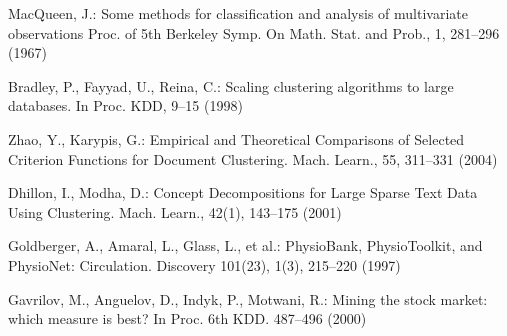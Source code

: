 \documentclass[conference]{IEEEtran}
\begin{document}
\begin{thebibliography}{5}
MacQueen, J.:
Some methods for classification and analysis of multivariate observations
Proc. of 5th Berkeley Symp. On  Math. Stat. and Prob., 1, 281--296 (1967)

Bradley, P., Fayyad, U., Reina, C.:
Scaling clustering algorithms to large databases. 
In Proc. KDD, 9--15 (1998)

\enlargethispage{0.5cm} 
Zhao, Y., Karypis, G.:
Empirical and Theoretical Comparisons of Selected Criterion Functions for Document Clustering.
Mach. Learn., 55, 311--331 (2004)

Dhillon, I., Modha, D.:
Concept Decompositions for Large Sparse Text Data Using Clustering.
Mach. Learn., 42(1), 143--175 (2001)

Goldberger, A., Amaral, L., Glass, L., et al.: PhysioBank, PhysioToolkit, and 
PhysioNet: Circulation. Discovery 101(23), 1(3), 215--220 (1997) 

Gavrilov, M., Anguelov, D., Indyk, P., Motwani, R.:
Mining the stock market: which measure is best? 
In Proc. 6th KDD. 487--496 (2000)
\end{thebibliography}




\end{document}
